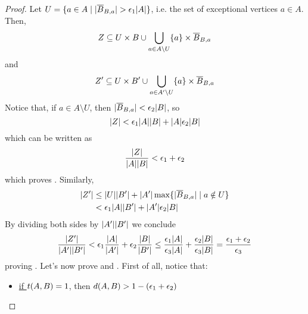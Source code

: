 \begin{lemma}[Lemma 5.17]
        \begin{proof}
            Let $U = \{ a \in A \mid | \overline{B}_{B,a} | > \epsilon_1 | A | \}$, i.e. the set
            of exceptional vertices $a \in A$.
            Then,
            \[
                Z \subseteq U \times B \cup \bigcup_{a \in A \setminus U} \{ a \} \times \overline{B}_{B,a}
            \]
            and
            \[
                Z' \subseteq U \times B' \cup \bigcup_{a \in A' \setminus U} \{ a \} \times \overline{B}_{B,a}
            \]
            Notice that, if $a \in A \setminus U$, then $| \overline{B}_{B,a} | < \epsilon_2 | B |$, so
            \[
                | Z | < \epsilon_1 | A | | B | + | A | \epsilon_2 | B |
            \]
            which can be written as
            \[
                    \frac{| Z |}{| A | | B |} < \epsilon_1 + \epsilon_2
            \]
            which proves .
            Similarly,
            \begin{align*}
                | Z' | & \leq | U | | B' | + | A' | \max \{ | \overline{B}_{B,a} | \mid a \notin U \} \\
                                 & < \epsilon_1 | A | | B' | + | A' | \epsilon_2 | B |
            \end{align*}
            By dividing both sides by $| A' | | B' |$ we conclude
            \[
                \frac{| Z' |}{| A' | | B' |} < \epsilon_1 \frac{| A |}{| A' |} + \epsilon_2 \frac{| B |}{| B' |}
                \leq \frac{\epsilon_1 | A |}{\epsilon_3 | A |} + \frac{\epsilon_2 | B |} {\epsilon_3 | B |}
                = \frac{\epsilon_1 + \epsilon_2}{\epsilon_3}
            \]
            proving .
            Let's now prove  and .
            First of all, notice that:
            \begin{itemize}
                \item \underline{if $t( A,B ) = 1$}, then $d( A,B ) > 1 - ( \epsilon_1 + \epsilon_2 )$

\end{itemize}
\end{proof}
\end{lemma}
